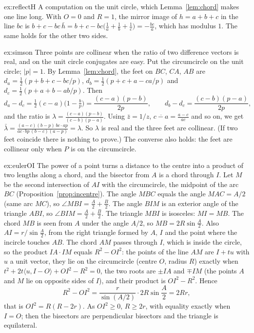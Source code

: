 \begin{solution}{ex:reflectH}
\idea A computation on the unit circle, which Lemma~\ref{lem:chord} makes one line long.
\writeup With $O=0$ and $R=1$, the mirror image of $h=a+b+c$ in the line $bc$ is $b+c-bc\,\bar h=b+c-bc\bigl(\frac1a+\frac1b+\frac1c\bigr)=-\frac{bc}a$,
which has modulus $1$. The same holds for the other two sides.
\end{solution}

\begin{solution}{ex:simson}
\idea Three points are collinear when the ratio of two difference vectors is real, and on the unit circle conjugates are easy.
\writeup Put the circumcircle on the unit circle; $|p|=1$. By Lemma~\ref{lem:chord}, the feet on $BC$, $CA$, $AB$ are
$d_a=\frac12(p+b+c-bc/p)$, $d_b=\frac12(p+c+a-ca/p)$ and $d_c=\frac12(p+a+b-ab/p)$. Then
\[
d_a-d_c=\tfrac12(c-a)\bigl(1-\tfrac bp\bigr)=\frac{(c-a)(p-b)}{2p},\qquad d_b-d_c=\frac{(c-b)(p-a)}{2p},
\]
and the ratio is $\lambda=\frac{(c-a)(p-b)}{(c-b)(p-a)}$. Using $\bar z=1/z$, $\overline{c-a}=\frac{a-c}{ac}$ and so on, we get
$\bar\lambda=\frac{(a-c)(b-p)\,bc\cdot ap}{ac\cdot bp\,(b-c)(a-p)}=\lambda$. So $\lambda$ is real and the three feet are collinear. (If two feet coincide
there is nothing to prove.) The converse also holds: the feet are collinear only when $P$ is on the circumcircle.
\end{solution}

\begin{solution}{ex:eulerOI}
\idea The power of a point turns a distance to the centre into a product of two lengths along a chord, and the bisector from $A$ is a
chord through $I$.
\writeup Let $M$ be the second intersection of $AI$ with the circumcircle, the midpoint of the arc $BC$ (Proposition~\ref{prop:incentre}).
The angle $MBC$ equals the angle $MAC=A/2$ (same arc $MC$), so $\angle MBI=\frac A2+\frac B2$. The angle $BIM$ is an exterior angle of the
triangle $ABI$, so $\angle BIM=\frac A2+\frac B2$. The triangle $MBI$ is isosceles: $MI=MB$. The chord $MB$ is seen from $A$ under the
angle $A/2$, so $MB=2R\sin\frac A2$. Also $AI=r/\sin\frac A2$, from the right triangle formed by $A$, $I$ and the point where the incircle
touches $AB$. The chord $AM$ passes through $I$, which is inside the circle, so the product $IA\cdot IM$ equals $R^2-OI^2$: the points of the line
$AM$ are $I+tu$ with $u$ a unit vector, they lie on the circumcircle (centre $O$, radius $R$) exactly when $t^2+2t\langle u,I-O\rangle+OI^2-R^2=0$,
the two roots are $\pm IA$ and $\mp IM$ (the points $A$ and $M$ lie on opposite sides of $I$), and their product is $OI^2-R^2$. Hence
\[
R^2-OI^2=\frac r{\sin(A/2)}\cdot2R\sin\frac A2=2Rr,
\]
that is $OI^2=R(R-2r)$. As $OI^2\ge0$, $R\ge2r$, with equality exactly when $I=O$; then the bisectors are perpendicular bisectors and
the triangle is equilateral.
\end{solution}

